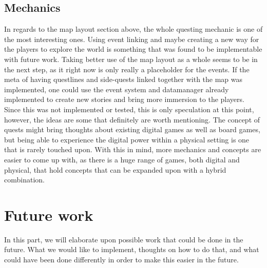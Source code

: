 \subsection{Mechanics}
In regards to the map layout section above, the whole questing mechanic is one of the most interesting ones. Using event linking and maybe creating a new way for the players to explore the world is something that was found to be implementable with future work. Taking better use of the map layout as a whole seems to be in the next step, as it right now is only really a placeholder for the events. If the meta of having questlines and side-quests linked together with the map was implemented, one could use the event system and datamanager already implemented to create new stories and bring more immersion to the players. Since this was not implemented or tested, this is only speculation at this point, however, the ideas are some that definitely are worth mentioning. The concept of quests might bring thoughts about existing digital games as well as board games, but being able to experience the digital power within a physical setting is one that is rarely touched upon. With this in mind, more mechanics and concepts are easier to come up with, as there is a huge range of games, both digital and physical, that hold concepts that can be expanded upon with a hybrid combination.


\section{Future work}
\label{sec:future}
In this part, we will elaborate upon possible work that could be done in the future. What we would like to implement, thoughts on how to do that, and what could have been done differently in order to make this easier in the future.

